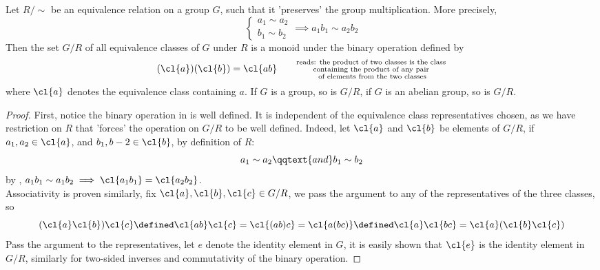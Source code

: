 \documentclass[../main-v2-manifolds.tex]{subfiles}
\begin{document}
\begin{wts}\label{hungerford-chp1:theorem1.5}
    Let $R/\sim$ be an equivalence relation on a group $G$, such that it 'preserves' the group multiplication. More precisely, 
    \[
        \begin{cases}
            a_1\sim a_2\\
            b_1\sim b_2
        \end{cases}\implies a_1b_1\sim a_2b_2
    \]
    Then the set $G/R$ of all equivalence classes of $G$ under $R$ is a monoid under the binary operation defined by 
    \begin{equation}\label{hungerford-chp1:theorem1.5-binary-operation}
        (\cl{a})(\cl{b})=\cl{ab}\quad\quad\substack{\text{reads: the product of two classes is the class}\\  \text{containing the product of any pair}\\ \text{ of elements from the two classes}}
    \end{equation}
    where $\cl{a}$ denotes the equivalence class containing $a$. If $G$ is a group, so is $G/R$, if $G$ is an abelian group, so is $G/R$.
\end{wts}
\begin{proof}
    First, notice the binary operation in  is well defined. It is independent of the equivalence class representatives chosen, as we have restriction on $R$ that 'forces' the operation on $G/R$ to be well defined. Indeed, let $\cl{a}$ and $\cl{b}$ be elements of $G/R$, if $a_1, a_2\in \cl{a}$, and $b_1,b-2\in\cl{b}$, by definition of $R$:
    \[
        a_1\sim a_2\qqtext{and}b_1\sim b_2
    \]
    by , $a_1b_1\sim a_1b_2\implies \cl{a_1b_1}=\cl{a_2b_2}$.\\

    Associativity is proven similarly, fix $\cl{a},\cl{b},\cl{c}\in G/R$, we pass the argument to any of the representatives of the three classes, so
    \[
        (\cl{a}\cl{b})\cl{c}\defined \cl{ab}\cl{c} =  \cl{(ab)c}=\cl{a(bc)}\defined\cl{a}\cl{bc}=\cl{a}(\cl{b}\cl{c})
    \]
    Pass the argument to the representatives, let $e$ denote the identity element in $G$, it is easily shown that $\cl{e}$ is the identity element in $G/R$, similarly for two-sided inverses and commutativity of the binary operation.
\end{proof}

\end{document}
